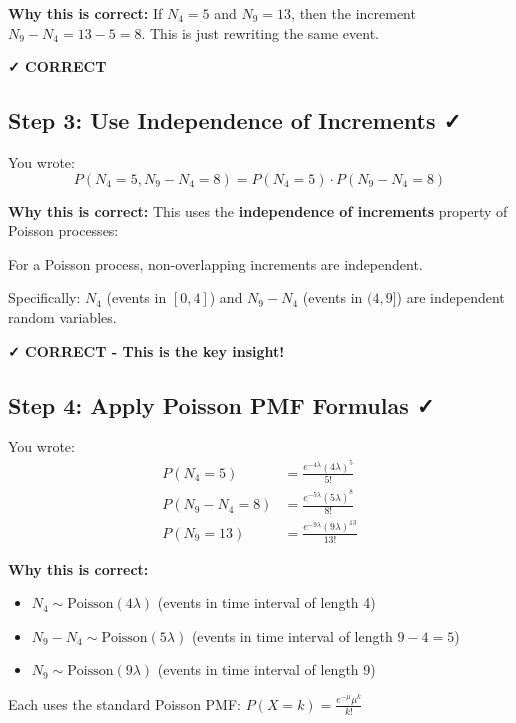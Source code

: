 \documentclass[11pt]{article}
\begin{document}
\textbf{Why this is correct:} If $N_4 = 5$ and $N_9 = 13$, then the increment $N_9 - N_4 = 13 - 5 = 8$. This is just rewriting the same event.

\textcolor{green!60!black}{\textbf{✓ CORRECT}}

\subsection{Step 3: Use Independence of Increments ✓}

You wrote:
\[
P(N_4 = 5, N_9 - N_4 = 8) = P(N_4 = 5) \cdot P(N_9 - N_4 = 8)
\]

\textbf{Why this is correct:} This uses the \textbf{independence of increments} property of Poisson processes:

\begin{tcolorbox}[colback=blue!5!white,colframe=blue!75!black,title=Independence of Increments]
For a Poisson process, non-overlapping increments are independent.

Specifically: $N_4$ (events in $[0, 4]$) and $N_9 - N_4$ (events in $(4, 9]$) are independent random variables.
\end{tcolorbox}

\textcolor{green!60!black}{\textbf{✓ CORRECT - This is the key insight!}}

\subsection{Step 4: Apply Poisson PMF Formulas ✓}

You wrote:
\begin{align*}
P(N_4 = 5) &= \frac{e^{-4\lambda}(4\lambda)^5}{5!} \\
P(N_9 - N_4 = 8) &= \frac{e^{-5\lambda}(5\lambda)^8}{8!} \\
P(N_9 = 13) &= \frac{e^{-9\lambda}(9\lambda)^{13}}{13!}
\end{align*}

\textbf{Why this is correct:}
\begin{itemize}
    \item $N_4 \sim \text{Poisson}(4\lambda)$ (events in time interval of length 4)
    \item $N_9 - N_4 \sim \text{Poisson}(5\lambda)$ (events in time interval of length $9-4=5$)
    \item $N_9 \sim \text{Poisson}(9\lambda)$ (events in time interval of length 9)
\end{itemize}

Each uses the standard Poisson PMF: $P(X = k) = \frac{e^{-\mu}\mu^k}{k!}$
\end{document}
